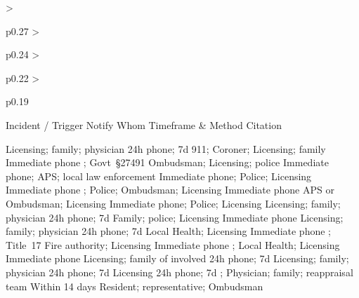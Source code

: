\begin{cheattablefour}
  {>{\raggedright\arraybackslash}p{0.27\linewidth}
   >{\raggedright\arraybackslash}p{0.24\linewidth}
   >{\raggedright\arraybackslash}p{0.22\linewidth}
   >{\raggedright\arraybackslash}p{0.19\linewidth}}
  {Incident / Trigger}
  {Notify Whom}
  {Timeframe \& Method}
  {Citation}

     {Licensing; family; physician}
     {24h phone; 7d \licUIR}
     {}
     {911; Coroner; Licensing; family}
     {Immediate phone}
     {; Govt~§27491}
     {Ombudsman; Licensing; police}
     {Immediate phone; \absWritten}
     {}
     {APS; local law enforcement}
     {Immediate phone; \absWritten}
     {}
     {Police; Licensing}
     {Immediate phone}
     {; }
     {Police; Ombudsman; Licensing}
     {Immediate phone}
     {}
     {APS or Ombudsman; Licensing}
     {Immediate phone; \absWritten}
     {}
     {Police; Licensing}
     {\theftWindow}
     {}
     {Licensing; family; physician}
     {24h phone; 7d \licUIR}
     {}
     {Family; police; Licensing}
     {Immediate phone}
     {}
     {Licensing; family; physician}
     {24h phone; 7d \licUIR}
     {}
     {Local Health; Licensing}
     {Immediate phone}
     {; Title~17}
     {Fire authority; Licensing}
     {Immediate phone}
     {; }
     {Local Health; Licensing}
     {Immediate phone}
     {}
     {Licensing; family of involved}
     {24h phone; 7d \licUIR}
     {}
     {Licensing; family; physician}
     {24h phone; 7d \licUIR}
     {}
     {Licensing}
     {24h phone; 7d \licUIR}
     {; }
     {Physician; family; reappraisal team}
     {Within 14 days}
     {}
     {Resident; representative; Ombudsman}

\end{cheattablefour}
